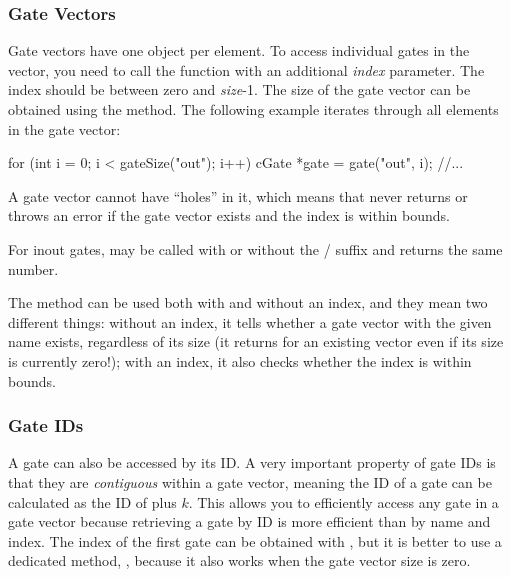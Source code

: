 \subsubsection{Gate Vectors}
\label{sec:simple-modules:gate-vectors}

Gate vectors have one  object per element.
To access individual gates in the vector, you need to call
the  function with an additional \textit{index}
parameter. The index should be between zero and \textit{size}-1.
The size of the gate vector can be obtained using the 
method. The following example iterates through all elements in the
gate vector:

\begin{cpp}
for (int i = 0; i < gateSize("out"); i++) {
    cGate *gate = gate("out", i);
    //...
}
\end{cpp}

A gate vector cannot have ``holes'' in it, which means that 
never returns  or throws an error if the gate vector exists
and the index is within bounds.

For inout gates,  may be called with or without
the / suffix and returns the same number.

The  method can be used both with and without an
index, and they mean two different things: without an index, it tells
whether a gate vector with the given name exists, regardless of its
size (it returns  for an existing vector even if its size
is currently zero!); with an index, it also checks whether the index
is within bounds.


\subsubsection{Gate IDs}
\label{sec:simple-modules:gate-ids}

A gate can also be accessed by its ID. A very important property of gate IDs
is that they are \textit{contiguous} within a gate vector, meaning
the ID of a gate  can be calculated as the ID of  plus $k$.
This allows you to efficiently access any gate in a gate vector because
retrieving a gate by ID is more efficient than by name and index.
The index of the first gate can be obtained with ,
but it is better to use a dedicated method, ,
because it also works when the gate vector size is zero.

